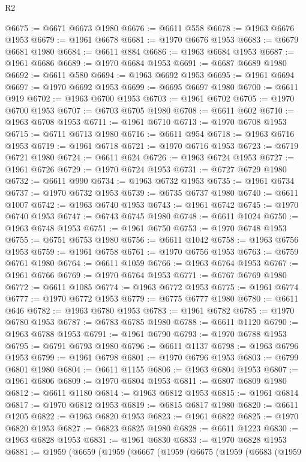\begin{lexlean}{R2}
\begin{coremodule}
@6675 := @6671 @6673 @1980
@6676 := @6611 @558
@6678 := @1963 @6676 @1953
@6679 := @1961 @6678
@6681 := @1970 @6676 @1953
@6683 := @6679 @6681 @1980
@6684 := @6611 @884
@6686 := @1963 @6684 @1953
@6687 := @1961 @6686
@6689 := @1970 @6684 @1953
@6691 := @6687 @6689 @1980
@6692 := @6611 @580
@6694 := @1963 @6692 @1953
@6695 := @1961 @6694
@6697 := @1970 @6692 @1953
@6699 := @6695 @6697 @1980
@6700 := @6611 @919
@6702 := @1963 @6700 @1953
@6703 := @1961 @6702
@6705 := @1970 @6700 @1953
@6707 := @6703 @6705 @1980
@6708 := @6611 @602
@6710 := @1963 @6708 @1953
@6711 := @1961 @6710
@6713 := @1970 @6708 @1953
@6715 := @6711 @6713 @1980
@6716 := @6611 @954
@6718 := @1963 @6716 @1953
@6719 := @1961 @6718
@6721 := @1970 @6716 @1953
@6723 := @6719 @6721 @1980
@6724 := @6611 @624
@6726 := @1963 @6724 @1953
@6727 := @1961 @6726
@6729 := @1970 @6724 @1953
@6731 := @6727 @6729 @1980
@6732 := @6611 @990
@6734 := @1963 @6732 @1953
@6735 := @1961 @6734
@6737 := @1970 @6732 @1953
@6739 := @6735 @6737 @1980
@6740 := @6611 @1007
@6742 := @1963 @6740 @1953
@6743 := @1961 @6742
@6745 := @1970 @6740 @1953
@6747 := @6743 @6745 @1980
@6748 := @6611 @1024
@6750 := @1963 @6748 @1953
@6751 := @1961 @6750
@6753 := @1970 @6748 @1953
@6755 := @6751 @6753 @1980
@6756 := @6611 @1042
@6758 := @1963 @6756 @1953
@6759 := @1961 @6758
@6761 := @1970 @6756 @1953
@6763 := @6759 @6761 @1980
@6764 := @6611 @1059
@6766 := @1963 @6764 @1953
@6767 := @1961 @6766
@6769 := @1970 @6764 @1953
@6771 := @6767 @6769 @1980
@6772 := @6611 @1085
@6774 := @1963 @6772 @1953
@6775 := @1961 @6774
@6777 := @1970 @6772 @1953
@6779 := @6775 @6777 @1980
@6780 := @6611 @646
@6782 := @1963 @6780 @1953
@6783 := @1961 @6782
@6785 := @1970 @6780 @1953
@6787 := @6783 @6785 @1980
@6788 := @6611 @1120
@6790 := @1963 @6788 @1953
@6791 := @1961 @6790
@6793 := @1970 @6788 @1953
@6795 := @6791 @6793 @1980
@6796 := @6611 @1137
@6798 := @1963 @6796 @1953
@6799 := @1961 @6798
@6801 := @1970 @6796 @1953
@6803 := @6799 @6801 @1980
@6804 := @6611 @1155
@6806 := @1963 @6804 @1953
@6807 := @1961 @6806
@6809 := @1970 @6804 @1953
@6811 := @6807 @6809 @1980
@6812 := @6611 @1180
@6814 := @1963 @6812 @1953
@6815 := @1961 @6814
@6817 := @1970 @6812 @1953
@6819 := @6815 @6817 @1980
@6820 := @6611 @1205
@6822 := @1963 @6820 @1953
@6823 := @1961 @6822
@6825 := @1970 @6820 @1953
@6827 := @6823 @6825 @1980
@6828 := @6611 @1223
@6830 := @1963 @6828 @1953
@6831 := @1961 @6830
@6833 := @1970 @6828 @1953
@6881 := @1959
    (@6659
      (@1959
        (@6667
          (@1959
            (@6675
              (@1959
                (@6683
                  (@1959

\end{coremodule}
\end{lexlean}
